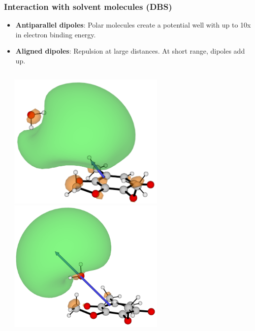 \documentclass[9pt,t,xcolor=table]{beamer}
\begin{document}
\begin{frame}
	\frametitle{\huge Interaction with solvent molecules (DBS)}\large
	\begin{itemize}
		\item \textbf{Antiparallel dipoles}: Polar molecules create a potential well with up to 10x in electron binding energy.
		\item \textbf{Aligned dipoles}: Repulsion at large distances. At short range, dipoles add up.
	\end{itemize}
	\vspace{5pt}
	\begin{columns}[c]
		\begin{column}{0.7\textwidth}
			\centering
			\small	
			
		\end{column}
		\hspace{40pt}
		\begin{column}{0.3\textwidth}
			\centering
	 		\includegraphics[width=0.6\textwidth]{Figs/Q0_H2O_H.png}\\
			\vfill
			\includegraphics[width=0.6\textwidth]{Figs/Q0_H2O_O.png}	
		\end{column}
	\end{columns}		
\end{frame}
\end{document}
